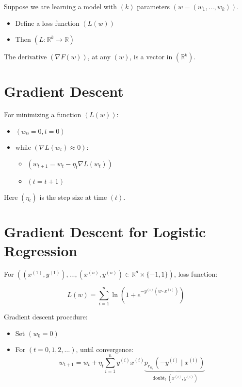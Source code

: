 \documentclass{article}
\begin{document}
Suppose we are learning a model with $( k )$ parameters $( w = \left(w_{1}, \ldots, w_{k}\right) )$.

\begin{itemize}
    \item Define a loss function $( L(w) )$
    \item Then $( L: \mathbb{R}^{k} \rightarrow \mathbb{R} )$
\end{itemize}

The derivative $( \nabla F(w) )$, at any $( w )$, is a vector in $( \mathbb{R}^{k} )$.

\section*{Gradient Descent}
For minimizing a function $( L(w) )$:

\begin{itemize}
    \item $( w_{0} = 0, t = 0 )$
    \item while $( \nabla L(w_{t}) \approx 0 )$:
    \begin{itemize}
        \item $( w_{t+1} = w_{t} - \eta_{t} \nabla L(w_{t}) )$
        \item $( t = t + 1 )$
    \end{itemize}
\end{itemize}

Here $( \eta_{t} )$ is the step size at time $( t )$.

\section*{Gradient Descent for Logistic Regression}
For $( \left(x^{(1)}, y^{(1)}\right), \ldots, \left(x^{(n)}, y^{(n)}\right) \in \mathbb{R}^{d} \times \{-1,1\} )$, loss function:

\begin{equation}
L(w) = \sum_{i=1}^{n} \ln \left(1 + e^{-y^{(i)}\left(w \cdot x^{(i)}\right)}\right)
\end{equation}

Gradient descent procedure:

\begin{itemize}
    \item Set $( w_{0} = 0 )$
    \item For $( t = 0, 1, 2, \ldots )$, until convergence:
    \begin{equation}
    w_{t+1} = w_{t} + \eta_{t} \sum_{i=1}^{n} y^{(i)} x^{(i)} \underbrace{p_{r_{w_{t}}}\left(-y^{(i)} \mid x^{(i)}\right)}_{\operatorname{doubt}_{t}\left(x^{(i)}, y^{(i)}\right)}
    \end{equation}
\end{itemize}
\end{document}
